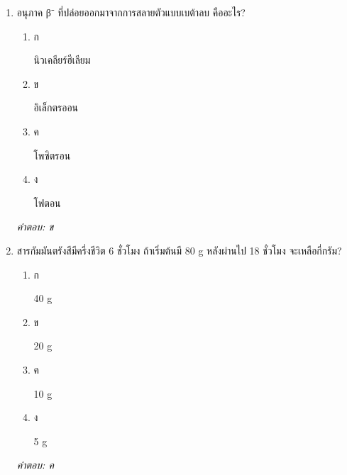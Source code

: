 \documentclass[12pt]{article}
\begin{document}
\begin{enumerate}[label=\arabic*., itemsep=0.5\baselineskip, topsep=0.5\baselineskip, leftmargin=*]
\item อนุภาค β⁻ ที่ปล่อยออกมาจากการสลายตัวแบบเบต้าลบ คืออะไร?
\begin{enumerate}[label=\alph*)., itemsep=0.3\baselineskip, topsep=0.3\baselineskip]
\item ก\ 
\begin{minipage}[t]{0.9\linewidth}
\raggedright นิวเคลียร์ฮีเลียม
\end{minipage}
\item ข\ 
\begin{minipage}[t]{0.9\linewidth}
\raggedright อิเล็กตรออน
\end{minipage}
\item ค\ 
\begin{minipage}[t]{0.9\linewidth}
\raggedright โพซิตรอน
\end{minipage}
\item ง\ 
\begin{minipage}[t]{0.9\linewidth}
\raggedright โฟตอน
\end{minipage}
\end{enumerate}
\vspace{-0.3\baselineskip}
\begin{small}
\textit{คำตอบ: ข}
\end{small}

\item สารกัมมันตรังสีมีครึ่งชีวิต 6 ชั่วโมง ถ้าเริ่มต้นมี 80 g หลังผ่านไป 18 ชั่วโมง จะเหลือกี่กรัม?
\begin{enumerate}[label=\alph*)., itemsep=0.3\baselineskip, topsep=0.3\baselineskip]
\item ก\ 
\begin{minipage}[t]{0.9\linewidth}
\raggedright 40 g
\end{minipage}
\item ข\ 
\begin{minipage}[t]{0.9\linewidth}
\raggedright 20 g
\end{minipage}
\item ค\ 
\begin{minipage}[t]{0.9\linewidth}
\raggedright 10 g
\end{minipage}
\item ง\ 
\begin{minipage}[t]{0.9\linewidth}
\raggedright 5 g
\end{minipage}
\end{enumerate}
\vspace{-0.3\baselineskip}
\begin{small}
\textit{คำตอบ: ค}
\end{small}


\end{enumerate}
\end{document}
